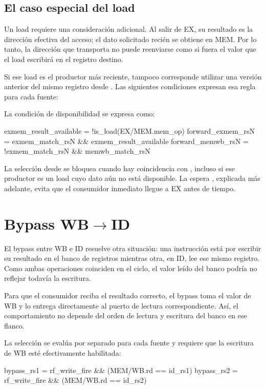 \subsection{El caso especial del load}

Un load requiere una consideración adicional. Al salir de EX, su resultado es
la dirección efectiva del acceso; el dato solicitado recién se obtiene en MEM.
Por lo tanto, la dirección que transporta  no puede
reenviarse como si fuera el valor que el load escribirá en el registro destino.

Si ese load es el productor más reciente, tampoco corresponde utilizar una
versión anterior del mismo registro desde . Las siguientes
condiciones expresan esa regla para cada fuente:

La condición de disponibilidad se expresa como:

\begin{codebox}
exmem_result_available = !is_load(EX/MEM.mem_op)
forward_exmem_rsN = exmem_match_rsN && exmem_result_available
forward_memwb_rsN = !exmem_match_rsN && memwb_match_rsN
\end{codebox}

La selección desde  se bloquea cuando hay coincidencia con
, incluso si ese productor es un load cuyo dato aún no está
disponible. La espera , explicada más adelante, evita que el
consumidor inmediato llegue a EX antes de tiempo.

\section{Bypass \texorpdfstring{WB$\rightarrow$ID}{WB a ID}}

El bypass entre WB e ID resuelve otra situación: una instrucción está por
escribir su resultado en el banco de registros mientras otra, en ID, lee ese
mismo registro. Como ambas operaciones coinciden en el ciclo, el valor leído
del banco podría no reflejar todavía la escritura.

Para que el consumidor reciba el resultado correcto, el bypass toma el valor
de WB y lo entrega directamente al puerto de lectura correspondiente. Así, el
comportamiento no depende del orden de lectura y escritura del banco en ese
flanco.

La selección se evalúa por separado para cada fuente y requiere que la escritura
de WB esté efectivamente habilitada:

\begin{codebox}
bypass_rs1 = rf_write_fire && (MEM/WB.rd == id_rs1)
bypass_rs2 = rf_write_fire && (MEM/WB.rd == id_rs2)
\end{codebox}


